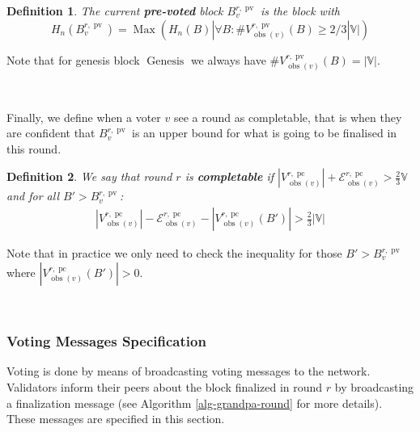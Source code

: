 \documentclass{article}
\newcommand{\nosymbol}{}
\newcommand{\tmop}[1]{\ensuremath{\operatorname{#1}}}
\newcommand{\tmstrong}[1]{\textbf{#1}}
\newcommand{\tmtextbf}[1]{{\bfseries{#1}}}
\newtheorem{definition}{Definition}
\providecommand{\nosymbol}{}
\providecommand{\tmop}[1]{\ensuremath{\mathrm{#1}}}
\providecommand{\tmstrong}[1]{\tmtextbf{#1}}
\providecommand{\tmtextbf}[1]{\tmtextbf{#1}}
\newtheorem{definition}{Definition}
\begin{document}
\begin{definition}
  The current {\tmstrong{pre-voted}} block $B^{r, \tmop{pv}}_v$ is the block
  with
  \[ H_n (B^{r, \tmop{pv}}_v) = \tmop{Max} (H_n (B) | \forall B :
     \#V_{\tmop{obs} (v)}^{r, \tmop{pv}} (B) \geqslant 2 / 3|\mathbb{V}|) \]
\end{definition}

Note that for genesis block $\tmop{Genesis}$ we always have $\#V_{\tmop{obs}
(v)}^{r, \tmop{pv}} (B) = | \mathbb{V} |$.

\

Finally, we define when a voter $v$ see a round as completable, that is when
they are confident that $B_v^{r, \tmop{pv}}$ is an upper bound for what is
going to be finalised in this round. \

\begin{definition}
  \label{defn-grandpa-completable}We say that round $r$ is
  {\tmstrong{completable}} if $|V^{r, \tmop{pc}}_{\tmop{obs} (v)} |
  +\mathcal{E}^{r, \tmop{pc}}_{\tmop{obs} (v)} > \frac{2}{3} \mathbb{V}$ and
  for all $B' > B_v^{r, \tmop{pv}}$:
  \[ \begin{array}{l}
       |V^{r, \tmop{pc}}_{\tmop{obs} (v)} | -\mathcal{E}^{r,
       \tmop{pc}}_{\tmop{obs} (v)} - |V^{r, \tmop{pc}}_{\tmop{obs}
       (v)_{\nosymbol}} (B') | > \frac{2}{3} |\mathbb{V}|
     \end{array} \]
\end{definition}

Note that in practice we only need to check the inequality for those $B' >
B_v^{r, \tmop{pv}}$ where $|V^{r, \tmop{pc}}_{\tmop{obs} (v)_{\nosymbol}} (B')
| > 0$.

\

\subsubsection{Voting Messages Specification}

Voting is done by means of broadcasting voting messages to the network.
Validators inform their peers about the block finalized in round $r$ by
broadcasting a finalization message (see Algorithm \ref{alg-grandpa-round} for
more details). These messages are specified in this section.
\end{document}
